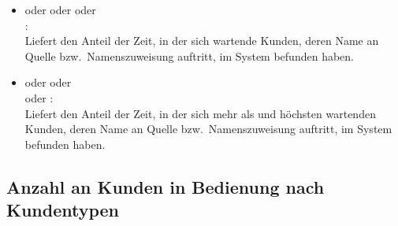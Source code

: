 \begin{itemize}
\item
{} oder  oder  oder\\ :\\
Liefert den Anteil der Zeit, in der sich  wartende Kunden, deren Name an Quelle bzw.\ Namenszuweisung  auftritt, im System befunden haben.

\item
{} oder  oder\\  oder :\\
Liefert den Anteil der Zeit, in der sich mehr als  und höchsten  wartenden Kunden, deren Name an Quelle bzw.\ Namenszuweisung  auftritt, im System befunden haben.

\end{itemize}



\subsection{Anzahl an Kunden in Bedienung nach Kundentypen}

